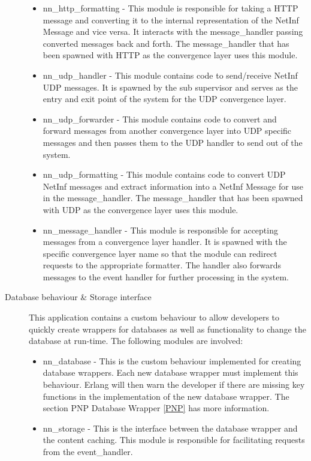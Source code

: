 \begin{description}
\begin{itemize}
\item nn\_http\_formatting - This module is responsible for taking a HTTP message and converting it to the internal representation of the NetInf Message and vice versa. It interacts with the message\_handler passing converted messages back and forth. The message\_handler that has been spawned with HTTP as the convergence layer uses this module.
\item nn\_udp\_handler - This module contains code to send/receive NetInf UDP messages. It is spawned by the sub supervisor and serves as the entry and exit point of the system for the UDP convergence layer.
\item nn\_udp\_forwarder - This module contains code to convert and forward messages from another convergence layer into UDP specific messages and then passes them to the UDP handler to send out of the system.
\item nn\_udp\_formatting - This module contains code to convert UDP NetInf messages and extract information into a NetInf Message for use in the message\_handler. The message\_handler that has been spawned with UDP as the convergence layer uses this module.
\item nn\_message\_handler - This module is responsible for accepting messages from a convergence layer handler. It is spawned with the specific convergence layer name so that the module can redirect requests to the appropriate formatter. The handler also forwards messages to the event handler for further processing in the system.
\end{itemize}
\item[Database behaviour \& Storage interface]
This application contains a custom behaviour to allow developers to quickly create wrappers for databases as well as functionality to change the database at run-time. The following modules are involved:
\begin {itemize}
\item nn\_database - This is the custom behaviour implemented for creating database wrappers. Each new database wrapper must implement this behaviour. Erlang will then warn the developer if there are missing key functions in the implementation of the new database wrapper. The section PNP Database Wrapper \ref{PNP} has more information.
\item nn\_storage - This is the interface between the database wrapper and the content caching. This module is responsible for facilitating requests from the event\_handler.
\end{itemize}

\end{description}
